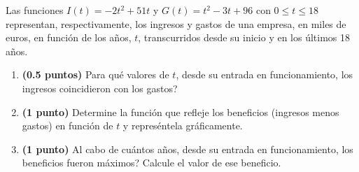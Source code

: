 
Las funciones $I(t)=-2t^2+51t$ y $G(t)=t^2-3t+96$ con $0\leq t\leq18$ representan, respectivamente, los ingresos y gastos de una empresa, en miles de euros, en función de los años, $t$, transcurridos desde su inicio y en los últimos 18 años.
\begin{enumerate}[label=\alph*)]
\item \textbf{(0.5 puntos)} \textquestiondown{}Para qué valores de $t$, desde su entrada en funcionamiento, los ingresos coincidieron con los gastos?
\item \textbf{(1 punto)} Determine la función que refleje los beneficios (ingresos menos gastos) en función de $t$ y represéntela gráficamente.
\item \textbf{(1 punto)} \textquestiondown{}Al cabo de cuántos años, desde su entrada en funcionamiento, los beneficios fueron máximos? Calcule el valor de ese beneficio.
\end{enumerate}
